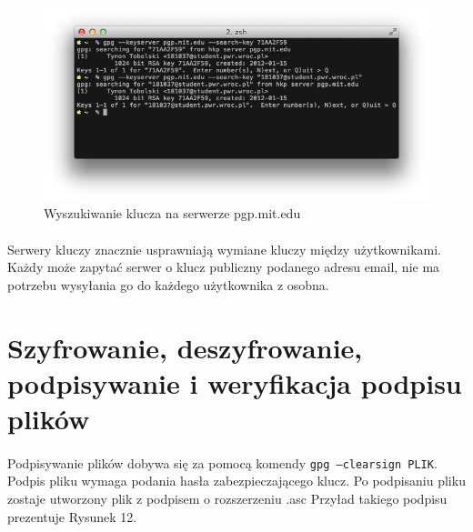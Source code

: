 \documentclass[wide,a4paper,titlepage,12pt] {article}
\begin{document}
  \begin{figure}[h!]
    \begin{center}
      \includegraphics[width=\textwidth]{img/11.png}
      \caption{Wyszukiwanie klucza na serwerze pgp.mit.edu}
    \end{center}
  \end{figure}

  \paragraph{}
  Serwery kluczy znacznie usprawniają wymiane kluczy między użytkownikami. Każdy może zapytać serwer o klucz publiczny podanego adresu email, nie ma potrzebu wysyłania go do każdego użytkownika z osobna.

  \newpage
  \section{Szyfrowanie, deszyfrowanie, podpisywanie i weryfikacja podpisu plików}
  \paragraph{}
  Podpisywanie plików dobywa się za pomocą komendy \texttt{gpg --clearsign PLIK}. Podpis pliku wymaga podania hasła zabezpieczającego klucz. Po podpisaniu pliku zostaje utworzony plik z podpisem o rozszerzeniu .asc  Przyład takiego podpisu prezentuje Rysunek 12.
\end{document}
